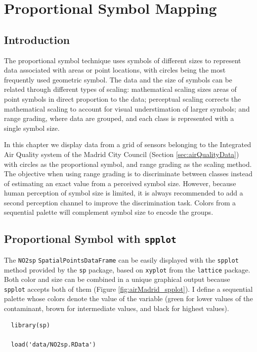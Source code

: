 

\section{Proportional Symbol Mapping}
\label{sec:org50569e0}
\label{sec:bubble}
\subsection{Introduction}
\label{sec:org5c481d2}
The proportional symbol technique uses symbols of different sizes
to represent data associated with areas or point locations, with
circles being the most frequently used geometric symbol. The data
and the size of symbols can be related through different types of
scaling: mathematical scaling sizes areas of point symbols in
direct proportion to the data; perceptual scaling corrects the
mathematical scaling to account for visual understimation of
larger symbols; and range grading, where data are grouped, and each
class is represented with a single symbol size. 

In this chapter we display data from a grid of sensors belonging to
the Integrated Air Quality system of the Madrid City Council (Section
\ref{sec:airQualityData}) with circles as the proportional symbol, and
range grading as the scaling method. The objective when using range
grading is to discriminate between classes instead of estimating an
exact value from a perceived symbol size. However, because human
perception of symbol size is limited, it is always recommended to
add a second perception channel to improve the discrimination
task. Colors from a sequential palette will complement symbol size to
encode the groups.


\subsection{Proportional Symbol with \texttt{spplot}}
\label{sec:org738a6b2}
The \texttt{NO2sp} \texttt{SpatialPointsDataFrame} can be easily displayed
with the \texttt{spplot} method provided by the \texttt{sp} package, based on
\texttt{xyplot} from the \texttt{lattice} package. Both color and size can be
combined in a unique graphical output because \texttt{spplot} accepts
both of them (Figure \ref{fig:airMadrid_spplot}). I define a
sequential palette whose colors denote the value of the variable
(green for lower values of the contaminant, brown for intermediate
values, and black for highest values).

\lstset{language=r,label= ,caption= ,captionpos=b,numbers=none}
\begin{lstlisting}
  library(sp)
  
  load('data/NO2sp.RData')
\end{lstlisting}

